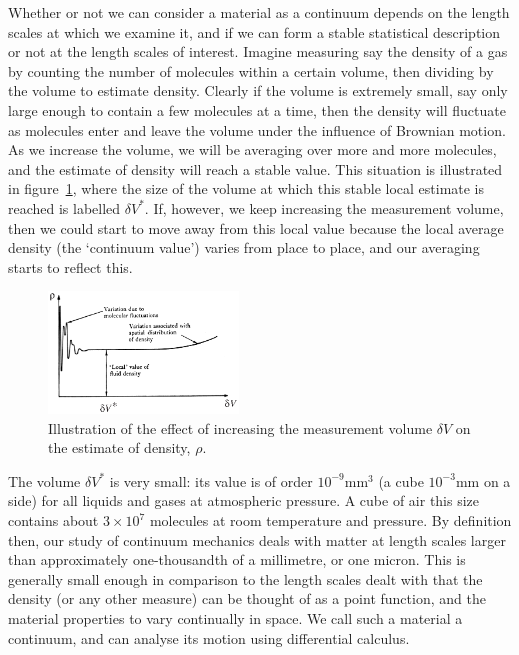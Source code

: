 \documentclass[twoside,11pt]		{report}
\begin{document}
Whether or not we can consider a material as a continuum depends on
the length scales at which we examine it, and if we can form a stable
statistical description or not at the length scales of interest.
Imagine measuring say the density of a gas by counting the number of
molecules within a certain volume, then dividing by the volume to
estimate density. Clearly if the volume is extremely small, say only
large enough to contain a few molecules at a time, then the density
will fluctuate as molecules enter and leave the volume under the
influence of Brownian motion. As we increase the volume, we will be
averaging over more and more molecules, and the estimate of density
will reach a stable value. This situation is illustrated in
figure~\ref{fig.bat2}, where the size of the volume at which this
stable local estimate is reached is labelled $\delta V^\ast$. If,
however, we keep increasing the measurement volume, then we could
start to move away from this local value because the local average
density (the `continuum value') varies from place to place, and our
averaging starts to reflect this.

\begin{figure}
\begin{center}
\includegraphics[bb=10 15 245 167,clip,width=0.45\textwidth]{Bat-1.2.1-mod.eps}
\end{center}
\caption{Illustration of the effect of increasing the measurement
  volume $\delta V$ on the estimate of density,
  $\rho$. \citep[After][]{bat67}}
\label{fig.bat2}
\end{figure}

The volume $\delta V^\ast$ is very small: its value is of order
$10^{-9}$mm$^3$ (\ie a cube $10^{-3}$mm on a side) for all liquids and
gases at atmospheric pressure. A cube of air this size contains about
$3\times10^{7}$ molecules at room temperature and pressure. By
definition then, our study of continuum mechanics deals with matter at
length scales larger than approximately one-thousandth of a
millimetre, or one micron. This is generally small enough in
comparison to the length scales dealt with that the density (or any
other measure) can be thought of as a point function, and the material
properties to vary continually in space. We call such a material a
continuum, and can analyse its motion using differential calculus.
\end{document}
